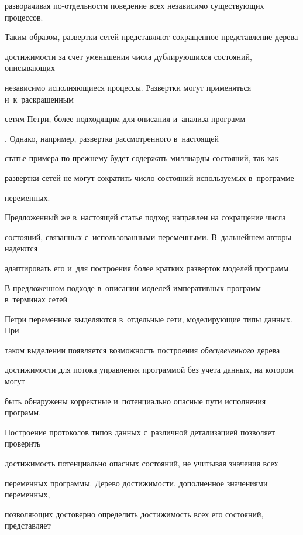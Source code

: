 разворачивая по-от\-дель\-ности поведение всех независимо существующих процессов. 


Таким образом, развертки сетей пред\-став\-ля\-ют сокращенное пред\-став\-ле\-ние дерева 


до\-сти\-жи\-мости за счет уменьшения чис\-ла дуб\-ли\-ру\-ющих\-ся со\-сто\-яний, опи\-сы\-ва\-ющих 


независимо ис\-пол\-ня\-ющи\-еся процессы. Развертки могут применяться и~к~раскрашенным 


сетям Петри, более под\-хо\-дя\-щим для описания и~анализа программ 


\cite{Kozura:2002}. Однако, например, раз\-верт\-ка рас\-смот\-рен\-но\-го в~настоящей 


\mbox{статье} примера по-преж\-не\-му будет содержать миллиарды со\-сто\-яний, так как 


развертки сетей не могут сократить чис\-ло состояний ис\-поль\-зу\-емых в~программе 


переменных.


Предложенный же в~настоящей статье  подход на\-прав\-лен на сокращение чис\-ла 


со\-сто\-яний, связанных с~использованными переменными. В~дальнейшем авторы надеются 


адап\-ти\-ро\-вать его и~для по\-стро\-ения более крат\-ких раз\-вер\-ток моделей программ.





В предложенном подходе в~описании моделей императивных программ в~терминах сетей 


Петри  переменные выделяются в~отдельные сети, мо\-де\-ли\-ру\-ющие типы данных. При 


таком выделении появляется воз\-мож\-ность по\-стро\-ения \textit{обесцвеченного} дерева 


до\-сти\-жи\-мости для потока управ\-ле\-ния программой без учета данных, на котором могут 


быть обнаружены корректные и~потенциально опас\-ные пути исполнения программ. 


По\-стро\-ение протоколов типов данных с~различной детализацией поз\-во\-ля\-ет проверить 


до\-сти\-жи\-мость потенциально опасных со\-сто\-яний, не учитывая значения всех 


переменных программы. Дерево до\-сти\-жи\-мости, дополненное значениями переменных, 


поз\-во\-ля\-ющих достоверно определить до\-сти\-жи\-мость всех его со\-сто\-яний, пред\-став\-ля\-ет 


